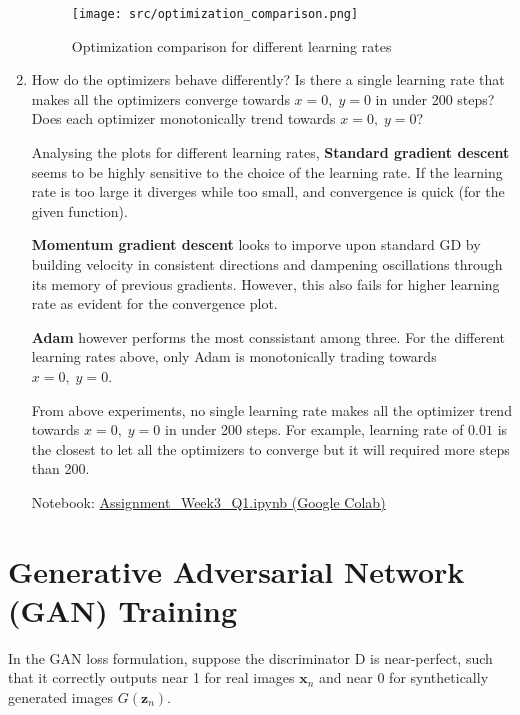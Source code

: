 \documentclass[12pt,a4paper]{article}
\begin{document}
\begin{enumerate}
    \begin{figure}[htb]
        \centering
        \texttt{[image: src/optimization\_comparison.png]}
        \caption{Optimization comparison for different learning rates}
        \label{fig:optimization_comparison}
    \end{figure}
    
    \item How do the optimizers behave differently? Is there a single learning rate that makes all the optimizers converge towards $x=0,\; y=0$ in under 200 steps? Does each optimizer monotonically trend towards $x=0,\; y=0$?

    Analysing the plots for different learning rates, \textbf{Standard gradient descent} seems to be highly sensitive to the choice of the 
    learning rate. If the learning rate is too large it diverges while too small, and convergence is quick (for the given function).
    
    \textbf{Momentum gradient descent} looks to imporve upon standard GD by building velocity in consistent directions and dampening oscillations through its memory of previous gradients. However, this also fails for higher learning rate as evident for the convergence plot.
    
    \textbf{Adam} however performs the most conssistant among three. For the different learning rates above, only Adam is monotonically trading towards $x=0,\; y=0$. 
    
    From above experiments, no single learning rate makes all the optimizer trend towards $x=0,\; y=0$ in under 200 steps. For example, learning rate of $0.01$ is the closest to let all the optimizers to converge but it will required more steps than 200.

Notebook: \href{https://colab.research.google.com/drive/1tf7sX_6Q1F7lb8I5yhct-AmUfKDZrwM3?usp=sharing}{Assignment\_Week3\_Q1.ipynb (Google Colab)}

\end{enumerate}

\section{Generative Adversarial Network (GAN) Training}

In the GAN loss formulation, suppose the discriminator D is near-perfect, such that it correctly outputs near 1 for real images $\mathbf{x}_n$ and near 0 for synthetically generated images $G(\mathbf{z}_n)$.
\end{document}
